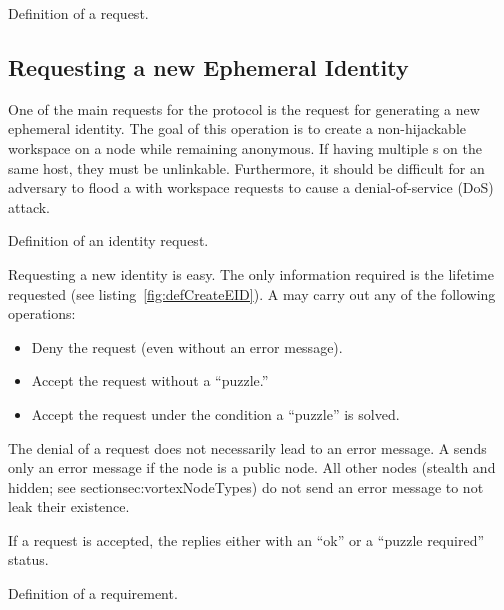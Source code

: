 \begin{lstfloat}[ht]
	
	\caption{Definition of a request.}
	\label{fig:defReply}
\end{lstfloat}

\subsection{Requesting a new Ephemeral Identity\label{sec:newEID}}
One of the main requests for the protocol is the request for generating a new ephemeral identity. The goal of this operation is to create a non-hijackable workspace on a node while remaining anonymous. If having multiple s on the same host, they must be unlinkable. Furthermore, it should be difficult for an adversary to flood a \VortexNode{} with workspace requests to cause a denial-of-service (DoS) attack.

\begin{lstfloat}[ht]
	
	\caption{Definition of an identity request.}
	\label{fig:defCreateEID}
\end{lstfloat}

Requesting a new identity is easy. The only information required is the lifetime requested (see listing~\ref{fig:defCreateEID}). A \VortexNode{} may carry out any of the following operations:
\begin{itemize}
	\item Deny the request (even without an error message).
	\item Accept the request without a ``puzzle.''
	\item Accept the request under the condition a ``puzzle'' is solved.
\end{itemize}

The denial of a request does not necessarily lead to an error message. A \VortexNode{} sends only an error message if the node is a public node. All other nodes (stealth and hidden; see section{sec:vortexNodeTypes}) do not send an error message to not leak their existence.

If a request is accepted, the \VortexNode{} replies either with an ``ok'' or a ``puzzle required'' status.

\begin{lstfloat}[ht]
	
	\caption{Definition of a requirement.}
	\label{fig:defRequirements}
\end{lstfloat}

